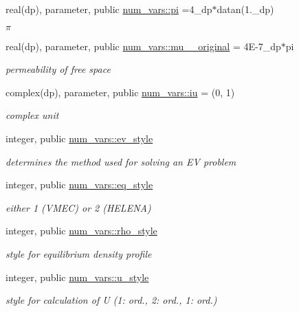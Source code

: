 \begin{DoxyCompactItemize}
real(dp), parameter, public \hyperlink{namespacenum__vars_a26f47310576a3414135b3d3fcc079709}{num\+\_\+vars\+::pi} =4\+\_\+dp$\ast$datan(1.\+\_\+dp)
\begin{DoxyCompactList}\small\item\em $\pi$ \end{DoxyCompactList}\item 
real(dp), parameter, public \hyperlink{namespacenum__vars_a50e309ca1a5833d2838ed7457b7eb686}{num\+\_\+vars\+::mu\+\_\+\_\+original} = 4\+E-\/7\+\_\+dp$\ast$pi
\begin{DoxyCompactList}\small\item\em permeability of free space \end{DoxyCompactList}\item 
complex(dp), parameter, public \hyperlink{namespacenum__vars_a3b9303c24ebbdff7b366337702795211}{num\+\_\+vars\+::iu} = (0, 1)
\begin{DoxyCompactList}\small\item\em complex unit \end{DoxyCompactList}\item 
integer, public \hyperlink{namespacenum__vars_aae749d5063afce3b912a097ff0993d00}{num\+\_\+vars\+::ev\+\_\+style}
\begin{DoxyCompactList}\small\item\em determines the method used for solving an EV problem \end{DoxyCompactList}\item 
integer, public \hyperlink{namespacenum__vars_a7d8763402037dbb80db19e2534ddf595}{num\+\_\+vars\+::eq\+\_\+style}
\begin{DoxyCompactList}\small\item\em either 1 (V\+M\+EC) or 2 (H\+E\+L\+E\+NA) \end{DoxyCompactList}\item 
integer, public \hyperlink{namespacenum__vars_a787c23d10a522ff93cf555587b71cc0d}{num\+\_\+vars\+::rho\+\_\+style}
\begin{DoxyCompactList}\small\item\em style for equilibrium density profile \end{DoxyCompactList}\item 
integer, public \hyperlink{namespacenum__vars_a5b3a837df1e82bb43fc47815c62c6b49}{num\+\_\+vars\+::u\+\_\+style}
\begin{DoxyCompactList}\small\item\em style for calculation of U (1\+: ord., 2\+: ord., 1\+: ord.) \end{DoxyCompactList}\item 

\end{DoxyCompactItemize}
